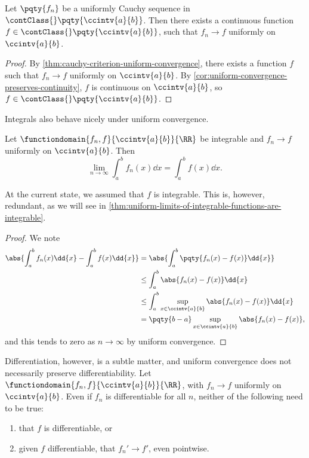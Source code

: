 \begin{theorem}
    Let \(\pqty{f_n}\) be a uniformly Cauchy sequence in \(\contClass{}\pqty{\ccintv{a}{b}}\). Then there exists a continuous function \(f \in \contClass{}\pqty{\ccintv{a}{b}}\), such that \(f_n \to f\) uniformly on \(\ccintv{a}{b}\).
\end{theorem}

\begin{proof}
    By \autoref{thm:cauchy-criterion-uniform-convergence}, there exists a function \(f\) such that \(f_n \to f\) uniformly on \(\ccintv{a}{b}\). By \autoref{cor:uniform-convergence-preserves-continuity}, \(f\) is continuous on \(\ccintv{a}{b}\), so \(f \in \contClass{}\pqty{\ccintv{a}{b}}\).
\end{proof}

Integrals also behave nicely under uniform convergence.

\begin{theorem}
    \label{thm:uniform-convergence-integrals}%
    Let \(\functiondomain{f_n, f}{\ccintv{a}{b}}{\RR}\) be integrable and \(f_n \to f\) uniformly on \(\ccintv{a}{b}\). Then
    \[
        \lim_{n \to \infty} \int_a^b f_n(x) \dd{x} = \int_a^b f(x) \dd{x}.
    \]
\end{theorem}

\begin{remark}
    At the current state, we assumed that \(f\) is integrable. This is, however, redundant, as we will see in \autoref{thm:uniform-limits-of-integrable-functions-are-integrable}.
\end{remark}

\begin{proof}
    We note
    \begin{align*}
        \abs{\int_a^b f_n(x) \dd{x} - \int_a^b f(x) \dd{x}} &= \abs{\int_a^b \pqty{f_n(x) - f(x)} \dd{x}} \\
        &\leq \int_a^b \abs{f_n(x) - f(x)} \dd{x} \\
        &\leq \int_a^b \sup_{x \in \ccintv{a}{b}} \abs{f_n(x) - f(x)} \dd{x} \\
        &= \pqty{b - a} \sup_{x \in \ccintv{a}{b}} \abs{f_n(x) - f(x)},
    \end{align*}
    and this tends to zero as \(n \to \infty\) by uniform convergence.
\end{proof}

Differentiation, however, is a subtle matter, and uniform convergence does not necessarily preserve differentiability. Let \(\functiondomain{f_n, f}{\ccintv{a}{b}}{\RR}\), with \(f_n \to f\) uniformly on \(\ccintv{a}{b}\). Even if \(f_n\) is differentiable for all \(n\), neither of the following need to be true:
\begin{enumerate}[label=(\roman*)]
    \item that \(f\) is differentiable, or
    \item given \(f\) differentiable, that \(f_n' \to f'\), even pointwise.
\end{enumerate}

